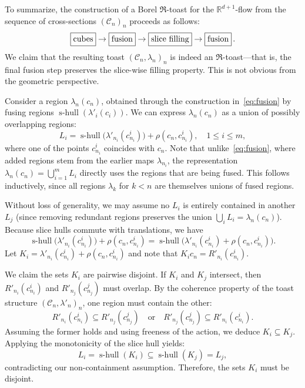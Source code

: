 \documentclass[12pt]{paper}
\numberwithin{equation}{section}
\theoremstyle{plain}
\theoremstyle{definition}
\newcommand{\R}{\mathbb{R}}
\newcommand{\mfR}{\mathfrak{R}}
\DeclareMathOperator{\shull}{\mathrm{s-hull}}
\begin{document}
To summarize, the construction of a Borel \(\mfR\)-toast for the \(\R^{d+1}\)-flow from the
sequence of cross-sections \((\mathcal{C}_{n})_{n}\) proceeds as follows:
\[ \boxed{\vphantom{fg}\text{cubes}} \to \boxed{\vphantom{fg}\text{fusion}} \to
  \boxed{\vphantom{fg}\text{slice filling}} \to \boxed{\vphantom{fg}\text{fusion}}\, . \]
We claim that the resulting toast \((\mathcal{C}_{n}, \lambda_{n})_{n}\) is indeed an
\(\mfR\)-toast—that is, the final fusion step preserves the slice-wise filling property. This is not
obvious from the geometric perspective.

Consider a region \(\lambda_{n}(c_{n})\), obtained through the construction in~\eqref{eq:fusion}
by fusing regions \(\shull(\lambda'_{i}(c_{i}))\). We can express \(\lambda_{n}(c_{n})\) as a union
of possibly overlapping regions:
\[
  L_{i} = \shull\bigl(\lambda'_{n_{i}}(c^{i}_{n_{i}})\bigr) + \rho(c_{n},c^{i}_{n_{i}}),\quad 1 \le
  i \le m,
\]
where one of the points \(c^{i}_{n_{i}}\) coincides with \(c_{n}\). Note that
unlike~\eqref{eq:fusion}, where added regions stem from the earlier maps \(\lambda_{n_{i}}\), the
representation \(\lambda_{n}(c_{n}) = \bigcup_{i=1}^{m}L_{i}\) directly uses the regions that are
being fused. This follows inductively, since all regions \(\lambda_{k}\) for \(k < n\) are
themselves unions of fused regions.

Without loss of generality, we may assume no \(L_{i}\) is entirely contained in another \(L_{j}\)
(since removing redundant regions preserves the union \(\bigcup_{i} L_{i} = \lambda_{n}(c_{n})\)).
Because slice hulls commute with translations, we have
\[
  \shull\bigl(\lambda'_{n_{i}}(c^{i}_{n_{i}})\bigr) + \rho(c_{n},c^{i}_{n_{i}}) =
  \shull\bigl(\lambda'_{n_{i}}(c^{i}_{n_{i}}) + \rho(c_{n},c^{i}_{n_{i}})\bigr).
\]
Let \(K_{i} = \lambda'_{n_{i}}(c^{i}_{n_{i}}) + \rho(c_{n},c^{i}_{n_{i}})\) and note that
\(K_{i}c_{n} = R'_{n_{i}}(c^{i}_{n_{i}})\).

We claim the sets \(K_{i}\) are pairwise disjoint. If \(K_{i}\) and \(K_{j}\) intersect, then
\(R'_{n_{i}}(c^{i}_{n_{i}})\) and \(R'_{n_{j}}(c^{j}_{n_{j}})\) must overlap. By the coherence
property of the toast structure \((\mathcal{C}_{n}, \lambda'_{n})_{n}\), one region must contain the
other:
\[
  R'_{n_{i}}(c^{i}_{n_{i}}) \subseteq R'_{n_{j}}(c^{j}_{n_{j}}) \quad \text{or} \quad
  R'_{n_{j}}(c^{j}_{n_{j}}) \subseteq R'_{n_{i}}(c^{i}_{n_{i}}).
\]
Assuming the former holds and using freeness of the action, we deduce
\(K_{i} \subseteq K_{j}\). Applying the monotonicity of the slice hull yields:
\[
  L_{i} = \shull(K_{i}) \subseteq \shull(K_{j}) = L_{j},
\]
contradicting our non-containment assumption. Therefore, the sets \(K_{i}\) must be disjoint.
\end{document}
